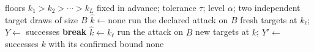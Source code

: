 \begin{algorithm}[t]
\caption{Fixed-sequence choice of a floor, with confirmation}\label{alg:selection}
\begin{algorithmic}[1]
\Require floors $k_1>k_2>\cdots>k_L$ fixed in advance; tolerance $\tau$; level $\alpha$;
  two independent target draws of size $B$
\State $\hat k\gets\text{none}$
 
  \State run the declared attack on $B$ fresh targets at $k_\ell$; $Y\gets$ successes
   \textbf{break} 
  \EndIf
  \State $\hat k\gets k_\ell$
\EndFor
{} 
    \State run the attack on $B$ new targets at $k$; $Y'\gets$ successes
     \Return $k$ with its confirmed bound
    \EndIf
  \EndFor
\EndIf
\State \Return none 
\end{algorithmic}
\end{algorithm}
